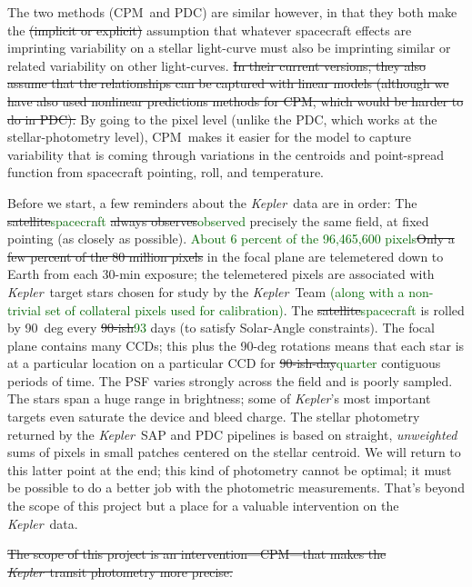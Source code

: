 \documentclass[12pt, preprint]{aastex}
\newcommand{\project}[1]{\textsl{#1}}
\newcommand{\Kepler}{\project{Kepler}}
\newcommand{\name}{CPM}
\newcommand{\revise}[1]{\textcolor{darkgreen}{#1}}
\newcommand{\remove}[1]{\sout{#1}}
\begin{document}
The two methods (\name\ and PDC) are similar however,
  in that they both make the \remove{(implicit or explicit)} assumption that whatever spacecraft effects are imprinting variability on a stellar light-curve
  must also be imprinting similar or related variability on other light-curves.
\remove{In their current versions, they also assume that the relationships can be captured with linear models (although we have also used nonlinear predictions methods for \name, which would be harder to do in PDC).}
By going to the pixel level (unlike the PDC, which works at the stellar-photometry level),
  \name\ makes it easier for the model to capture variability
  that is coming through variations in the centroids and point-spread function
  from spacecraft pointing, roll, and temperature.

Before we start, a few reminders about the \Kepler\ data are in order:
The \remove{satellite}\revise{spacecraft} \remove{always observes}\revise{observed} precisely the same field, at fixed pointing (as closely as possible).
\revise{About 6 percent of the 96,465,600 pixels}\remove{Only a few percent of the 80 million pixels} in the focal plane are telemetered down
  to Earth from each 30-min exposure;
  the telemetered pixels are associated with \Kepler\ target stars chosen for study by the \Kepler\ Team \revise{(along with a non-trivial set of collateral pixels used for calibration)}.
The \remove{satellite}\revise{spacecraft} is rolled by 90~deg every \remove{90-ish}\revise{93} days (to satisfy Solar-Angle constraints).
The focal plane contains many CCDs;
  this plus the 90-deg rotations means that each star is at a particular location
  on a particular CCD for \remove{90-ish-day}\revise{quarter} contiguous periods of time.
The PSF varies strongly across the field and is poorly sampled.
The stars span a huge range in brightness;
  some of \Kepler's most important targets even saturate the device and bleed charge.
The stellar photometry returned by the \Kepler\ SAP and PDC pipelines is based on
  straight, \emph{unweighted} sums of pixels in small patches centered on the stellar centroid.
We will return to this latter point at the end;
  this kind of photometry cannot be optimal;
  it must be possible to do a better job with the photometric measurements.
That's beyond the scope of this project but a place for a valuable intervention on the \Kepler\ data.

\remove{The scope of this project is an intervention---\name---that makes the \Kepler\ transit photometry more precise.}
\end{document}
